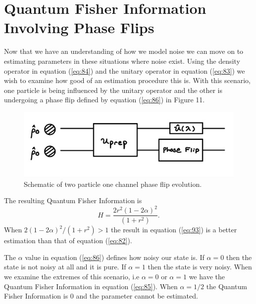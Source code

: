 \documentclass[twocolumn]{article}
\begin{document}
\section*{Quantum Fisher Information Involving Phase Flips}
Now that we have an understanding of how we model noise we can move on to estimating parameters in these situations where noise exist. Using the density operator in equation (\ref{eq:84}) and the unitary operator in equation (\ref{eq:83}) we wish to examine how good of an estimation procedure this is. With this scenario, one particle is being influenced by the unitary operator and the other is undergoing a phase flip defined by equation (\ref{eq:86}) in Figure 11. 
\begin{figure}[htpb]
\begin{center}
\includegraphics[width=0.90\linewidth]{Two-Particle-Phase-Flip.jpg}
\caption{Schematic of two particle one channel phase flip evolution.}
\end{center}
\end{figure}
\newline
The resulting Quantum Fisher Information is
\begin{equation}\label{eq:93}
H=\frac{2r^2(1-2\alpha)^2}{(1+r^2)}.
\end{equation}
When $2(1-2\alpha)^2/(1+r^2)>1$ the result in equation (\ref{eq:93}) is a better estimation than that of equation (\ref{eq:82}).

The $\alpha$ value in equation (\ref{eq:86}) defines how noisy our state is. If $\alpha=0$ then the state is not noisy at all and it is pure. If $\alpha=1$ then the state is very noisy. When we examine the extremes of this scenario, i.e $\alpha=0$ or $\alpha=1$ we have the Quantum Fisher Information in equation (\ref{eq:85}). When $\alpha=1/2$ the Quantum Fisher Information is 0 and the parameter cannot be estimated.
\end{document}

